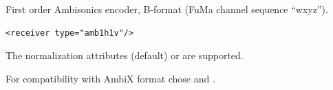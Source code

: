 First order Ambisonics encoder, B-format (FuMa channel sequence
``wxyz'').

\begin{lstlisting}[numbers=none]
<receiver type="amb1h1v"/>
\end{lstlisting}

The normalization attributes  (default) or
 are supported.



For compatibility with AmbiX format chose  and .
